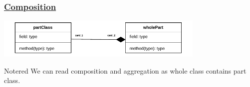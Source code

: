 \subsubsection*{\underline{Composition}}

\begin{center}
\includegraphics[width=0.75\textwidth]{Chapters/Diagram/OOP/Sum/Composition/composition.drawio.pdf}
\end{center}

\vspace{1cm}
\begin{prettyBox}{Note}{red}
We can read composition and aggregation as whole class contains part class.
\end{prettyBox}

